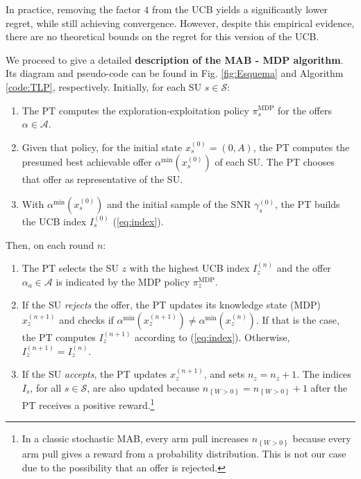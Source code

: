 In practice, removing the factor $4$ from the UCB yields a significantly lower regret, while still achieving convergence. However, despite this empirical evidence, there are no theoretical bounds on the regret for this version of the UCB.

We proceed to give a detailed \textbf{description of the MAB - MDP algorithm}. Its diagram and pseudo-code can be found in Fig. \ref{fig:Esquema} and Algorithm \ref{code:TLP}, respectively. Initially, for each SU $s \in \mathcal{S}$:
\begin{enumerate}
\item The PT computes the exploration-exploitation policy $\pi_s^{\text{MDP}}$ for the offers $\alpha \in \mathcal{A}$. 
\item Given that policy, for the initial state $x_s^{(0)} = (0,A)$, the PT computes the presumed best achievable offer $\alpha^{\text{min}}(x_s^{(0)})$ of each SU. The PT chooses that offer as representative of the SU. 
\item With $\alpha^{\text{min}}(x_s^{(0)})$ and the initial sample of the SNR $\gamma^{(0)}_s$,
the PT builds the UCB index $I_{s}^{(0)}$ (\ref{eq:index}).
\setcounter{enumTemp}{\theenumi}
\end{enumerate}
Then, on each round $n$:
\begin{enumerate}
\setcounter{enumi}{\theenumTemp}
\item The PT selects the SU $z$ with the highest UCB index $I_{z}^{(n)}$ and the offer $\alpha_a \in \mathcal{A}$ is indicated by the MDP policy $\pi_z^{\text{MDP}}$.
\item If the SU \textit{rejects} the offer, the PT updates its knowledge state (MDP) $x_z^{(n+1)}$ and checks if $\alpha^{\text{min}}(x_z^{(n+1)}) \neq \alpha^{\text{min}}(x_z^{(n)})$. If that is the case, the PT computes $I_{z}^{(n+1)}$ according to (\ref{eq:index}). Otherwise, $I_{z}^{(n+1)} = I_{z}^{(n)}$.
\item If the SU \textit{accepts}, the PT updates $x_z^{(n+1)}$, and sets $n_z =n_z+1$. The indices $I_{s}$, for all $s\in\mathcal{S}$, are also updated because $n_{\left\{W>0\right\}}  = n_{\left\{W>0\right\}}+1$ after the PT receives a positive reward.\footnote{In a classic stochastic MAB, every arm pull increases $n_{\left\{W>0\right\}}$  because every arm pull gives a reward from a probability distribution. This is not our case due to the possibility that an offer is rejected.}
\end{enumerate}

